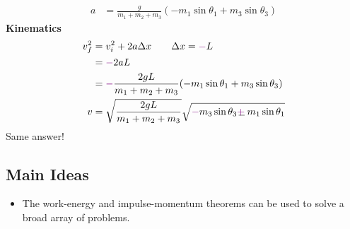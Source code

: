 \documentclass[]{article}
\begin{document}
\begin{TeacherMargin}
\begin{align*}
	a & = \frac{g}{m_{1}+m_{2}+m_{3}}(-m_{1}\sin\theta_{1}+m_{3}\sin\theta_{3})
\end{align*}
\textbf{Kinematics}
\begin{align*}
	v_{f}^{2} & = v_{i}^{2} + 2a\Delta x \qquad \Delta x = {\color{violet}-}L \\
	& = {\color{violet}-}2aL \\
	& = {\color{violet}-}\frac{2gL}{m_{1}+m_{2}+m_{3}}(-m_{1}\sin\theta_{1}+m_{3}\sin\theta_{3}) \\
	v & = \sqrt{\frac{2gL}{m_{1}+m_{2}+m_{3}}}\sqrt{{\color{violet}-}m_{3}\sin\theta_{3}\Vpm m_{1}\sin\theta_{1}}
\end{align*}
Same answer!
\end{TeacherMargin}
\begin{PresentSpace}
\section*{Main Ideas}
\begin{itemize}
	\item The work-energy and impulse-momentum theorems can be used to solve a broad array of problems.
\end{itemize}
\end{PresentSpace}
\end{document}
